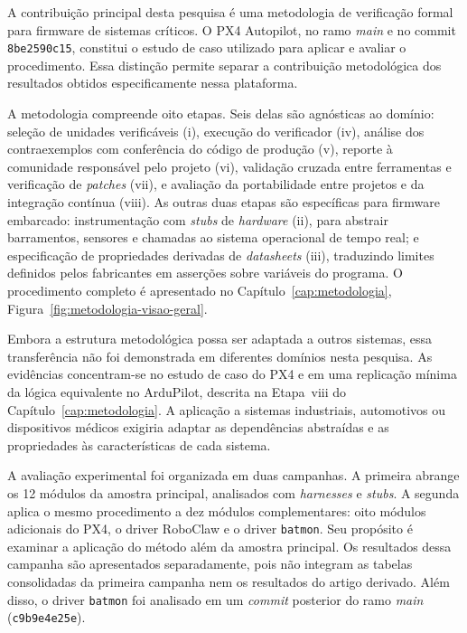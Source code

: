 A contribuição principal desta pesquisa é uma metodologia de verificação formal para firmware de sistemas críticos. O PX4 Autopilot, no ramo \textit{main} e no commit \texttt{8be2590c15}, constitui o estudo de caso utilizado para aplicar e avaliar o procedimento. Essa distinção permite separar a contribuição metodológica dos resultados obtidos especificamente nessa plataforma.

A metodologia compreende oito etapas. Seis delas são agnósticas ao domínio: seleção de unidades verificáveis (i), execução do verificador (iv), análise dos contraexemplos com conferência do código de produção (v), reporte à comunidade responsável pelo projeto (vi), validação cruzada entre ferramentas e verificação de \textit{patches} (vii), e avaliação da portabilidade entre projetos e da integração contínua (viii). As outras duas etapas são específicas para firmware embarcado: instrumentação com \textit{stubs} de \textit{hardware} (ii), para abstrair barramentos, sensores e chamadas ao sistema operacional de tempo real; e especificação de propriedades derivadas de \textit{datasheets} (iii), traduzindo limites definidos pelos fabricantes em asserções sobre variáveis do programa. O procedimento completo é apresentado no Capítulo~\ref{cap:metodologia}, Figura~\ref{fig:metodologia-visao-geral}.

Embora a estrutura metodológica possa ser adaptada a outros sistemas, essa transferência não foi demonstrada em diferentes domínios nesta pesquisa. As evidências concentram-se no estudo de caso do PX4 e em uma replicação mínima da lógica equivalente no ArduPilot, descrita na Etapa~viii do Capítulo~\ref{cap:metodologia}. A aplicação a sistemas industriais, automotivos ou dispositivos médicos exigiria adaptar as dependências abstraídas e as propriedades às características de cada sistema.

A avaliação experimental foi organizada em duas campanhas. A primeira abrange os 12 módulos da amostra principal, analisados com \textit{harnesses} e \textit{stubs}. A segunda aplica o mesmo procedimento a dez módulos complementares: oito módulos adicionais do PX4, o driver RoboClaw e o driver \texttt{batmon}. Seu propósito é examinar a aplicação do método além da amostra principal. Os resultados dessa campanha são apresentados separadamente, pois não integram as tabelas consolidadas da primeira campanha nem os resultados do artigo derivado. Além disso, o driver \texttt{batmon} foi analisado em um \textit{commit} posterior do ramo \textit{main} (\texttt{c9b9e4e25e}).

